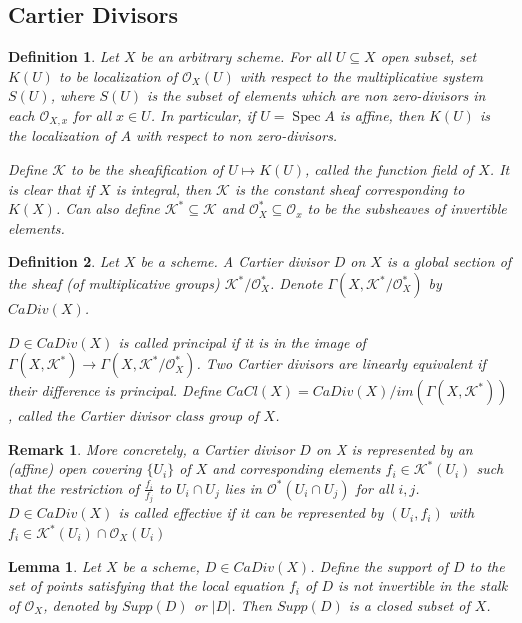 \documentclass{ctexart}
\newtheorem{definition}{Definition}[section]
\newtheorem{remark}{Remark}[section]
\newtheorem{lemma}{Lemma}[section]
\newcommand{\spec}{\operatorname{Spec}}
\begin{document}
\subsection{Cartier Divisors}
\begin{definition}
    Let $X$ be an arbitrary scheme.
    For all $U \subseteq X$ open subset, set $K(U)$ to be localization of $\mathcal{O}_{X}(U)$ with respect to the multiplicative system $S(U)$,
    where $S(U)$ is the subset of elements which are non zero-divisors in each $\mathcal{O}_{X, x}$ for all $x\in U$.
    In particular, if $U = \spec A$ is affine, then $K(U)$ is the localization of $A$ with respect to non zero-divisors.
    \par
    Define $\mathcal{K}$ to be the sheafification of $U \longmapsto K(U)$, called the function field of $X$.
    It is clear that if $X$ is integral, then $\mathcal{K}$ is the constant sheaf corresponding to $K(X)$.
    Can also define $\mathcal{K}^{\ast} \subseteq \mathcal{K}$ and $\mathcal{O}_{X}^{\ast} \subseteq \mathcal{O}_{x}$ to be the subsheaves of invertible elements.
\end{definition}
\begin{definition}
    Let $X$ be a scheme.
    A Cartier divisor $D$ on $X$ is a global section of the sheaf (of multiplicative groups) $\mathcal{K}^{\ast}/\mathcal{O}_{X}^{\ast}$.
    Denote $\Gamma(X, \mathcal{K}^{\ast}/\mathcal{O}_{X}^{\ast})$ by $CaDiv(X)$.
    \par
    $D\in CaDiv(X)$ is called principal if it is in the image of $\Gamma(X, \mathcal{K}^{\ast}) \longrightarrow \Gamma(X, \mathcal{K}^{\ast}/\mathcal{O}_{X}^{\ast})$.
    Two Cartier divisors are linearly equivalent if their difference is principal.
    Define $CaCl(X) = CaDiv(X)/im(\Gamma(X, \mathcal{K}^{\ast}))$, called the Cartier divisor class group of $X$.
\end{definition}
\begin{remark}
    More concretely, a Cartier divisor $D$ on X is represented by an (affine) open covering $\{U_{i}\}$ of $X$ and corresponding elements $f_{i}\in \mathcal{K}^{\ast}(U_{i})$ such that the restriction of $\frac{f_{i}}{f_{j}}$ to $U_{i} \cap U_{j}$ lies in $\mathcal{O}^{\ast}(U_{i} \cap U_{j})$ for all $i,j$.
    $D\in CaDiv(X)$ is called effective if it can be represented by $(U_{i}, f_{i})$ with $f_{i}\in \mathcal{K}^{\ast}(U_{i}) \cap \mathcal{O}_{X}(U_{i})$
\end{remark}
\begin{lemma}
    Let $X$ be a scheme, $D\in CaDiv(X)$.
    Define the support of $D$ to the set of points satisfying that the local equation $f_{i}$ of $D$ is not invertible in the stalk of $\mathcal{O}_{X}$, denoted by $Supp(D)$ or $|D|$.
    Then $Supp(D)$ is a closed subset of $X$.
    \label{Lemma 8.2} 
\end{lemma}
\end{document}
